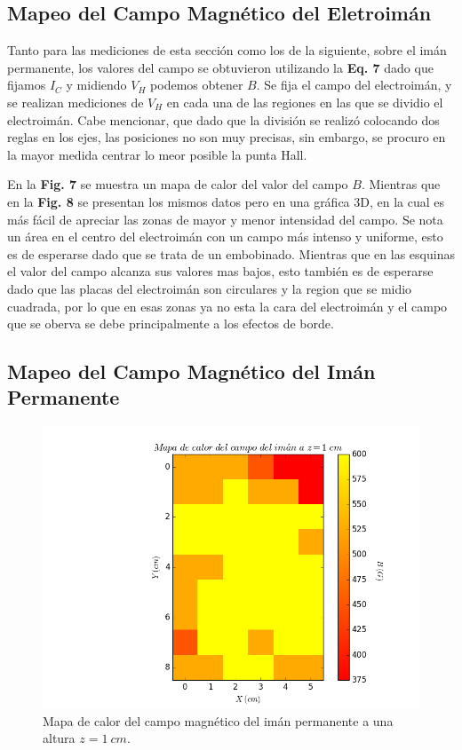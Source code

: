 \documentclass[twocolumn,showpacs,preprintnumbers,amsmath,amssymb]{revtex4-1}
\begin{document}
\subsection{Mapeo del Campo Magnético del Eletroimán}

Tanto para las mediciones de esta sección como los de la siguiente, sobre el imán permanente, los valores del campo
se obtuvieron utilizando la \textbf{Eq. 7} dado que fijamos $I_C$ y midiendo $V_H$ podemos obtener $B$. Se fija
el campo del electroimán, y se realizan mediciones de $V_H$ en cada una de las regiones en las que se dividio el electroimán.
Cabe mencionar, que dado que la división se realizó colocando dos reglas en los ejes, las posiciones no son muy precisas, sin
embargo, se procuro en la mayor medida centrar lo meor posible la punta Hall.

En la \textbf{Fig. 7} se muestra un mapa de calor del valor del campo $B$. Mientras que en la \textbf{Fig. 8} se presentan los mismos
datos pero en una gráfica 3D, en la cual es más fácil de apreciar las zonas de mayor y menor intensidad del campo. Se nota
un área en el centro del electroimán con un campo más intenso y uniforme, esto es de esperarse dado que se trata de un
embobinado. Mientras que en las esquinas el valor del campo alcanza sus valores mas bajos, esto también es de esperarse
dado que las placas del electroimán son circulares y la region que se midio cuadrada, por lo que en esas zonas ya no esta la
cara del electroimán y el campo que se oberva se debe principalmente a los efectos de borde.


\subsection{Mapeo del Campo Magnético del Imán Permanente}

\begin{figure}
\includegraphics[scale=0.46]{figura_9.png}
\caption{\label{fig:epsart}Mapa de calor del campo magnético del imán permanente a una altura $z = 1\ cm$.}
\end{figure}
\end{document}
